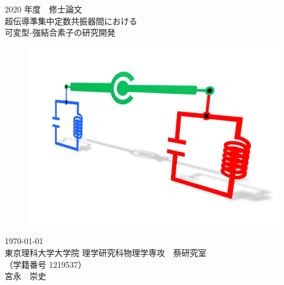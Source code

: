 \documentclass[uplatex,openany,oneside,a4j,11pt]{jsbook}
\begin{document}
\begin{titlepage}
    \begin{center}
        {\Large 2020 年度　修士論文}\\
        \vspace{80truept}
        {\Huge 超伝導準集中定数共振器間における\\
        \vspace{10truept}
        可変型-強結合素子の研究開発}\\ 
        \vspace{40truept}
        \begin{figure}[H]
            \centering
            \includegraphics[width=16cm]{表紙2.pdf}
        \end{figure}
        {\Large \today}\\
        \vspace{10truept}
        {\Large 東京理科大学大学院 理学研究科物理学専攻　蔡研究室\\
        （学籍番号 1219537）}\\
        \vspace{20truept}
        {\huge 宮永　崇史}\\

    \end{center}
\end{titlepage}
{}


\setcounter{tocdepth}{2}
\tableofcontents
\end{document}
